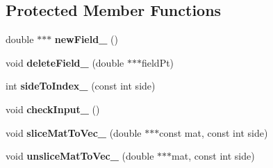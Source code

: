 \subsection*{Protected Member Functions}
\begin{DoxyCompactItemize}
\item 
\hypertarget{class_grid_a23877f79f95e9a109e908d930c8036b4}{}\label{class_grid_a23877f79f95e9a109e908d930c8036b4} 
double $\ast$$\ast$$\ast$ {\bfseries new\+Field\+\_\+} ()
\item 
\hypertarget{class_grid_acaa1c3843fd96478b3a5e9f62401d8e0}{}\label{class_grid_acaa1c3843fd96478b3a5e9f62401d8e0} 
void {\bfseries delete\+Field\+\_\+} (double $\ast$$\ast$$\ast$field\+Pt)
\item 
\hypertarget{class_grid_a91fc198085fdfeaa6378a99db4dbc6ac}{}\label{class_grid_a91fc198085fdfeaa6378a99db4dbc6ac} 
int {\bfseries side\+To\+Index\+\_\+} (const int side)
\item 
\hypertarget{class_grid_af631b4ec77d5ad46d17abe24155114c1}{}\label{class_grid_af631b4ec77d5ad46d17abe24155114c1} 
void {\bfseries check\+Input\+\_\+} ()
\item 
\hypertarget{class_grid_adfae48e6068488739c8823bc575f4f0a}{}\label{class_grid_adfae48e6068488739c8823bc575f4f0a} 
void {\bfseries slice\+Mat\+To\+Vec\+\_\+} (double $\ast$$\ast$$\ast$const mat, const int side)
\item 
\hypertarget{class_grid_a99b9c649ef28f41fa939d4517f504eb0}{}\label{class_grid_a99b9c649ef28f41fa939d4517f504eb0} 
void {\bfseries unslice\+Mat\+To\+Vec\+\_\+} (double $\ast$$\ast$$\ast$mat, const int side)
\end{DoxyCompactItemize}
